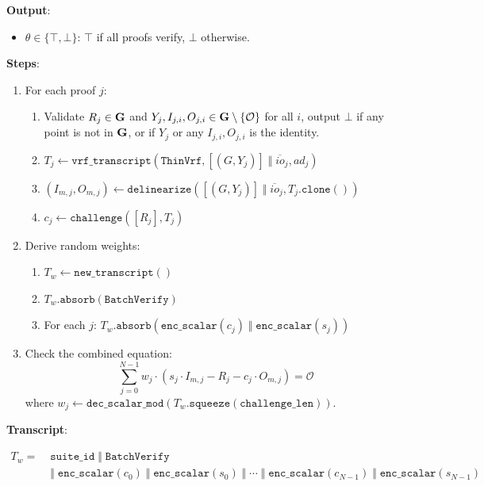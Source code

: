 \documentclass[
]{article}
\providecommand{\tightlist}{%
  \setlength{\itemsep}{0pt}\setlength{\parskip}{0pt}}
\begin{document}
\textbf{Output}:

\begin{itemize}
\tightlist
\item
  \(\theta \in \{ \top, \bot \}\): \(\top\) if all proofs verify,
  \(\bot\) otherwise.
\end{itemize}

\textbf{Steps}:

\begin{enumerate}
\def\labelenumi{\arabic{enumi}.}
\tightlist
\item
  For each proof \(j\):

  \begin{enumerate}
  \def\labelenumii{\alph{enumii}.}
  \tightlist
  \item
    Validate \(R_j \in \bold{G}\) and
    \(Y_j, I_{j,i}, O_{j,i} \in \bold{G}\setminus \{\mathcal{O}\}\) for
    all \(i\), output \(\bot\) if any point is not in \(\bold{G}\), or
    if \(Y_j\) or any \(I_{j,i}, O_{j,i}\) is the identity.
  \item
    \(T_j \gets \texttt{vrf\_transcript}(\texttt{ThinVrf}, [(G, Y_j)] \;\Vert\; \overline{io}_j, ad_j)\)
  \item
    \((I_{m,j}, O_{m,j}) \gets \texttt{delinearize}([(G, Y_j)] \;\Vert\; \overline{io}_j, T_j.\texttt{clone}())\)
  \item
    \(c_j \gets \texttt{challenge}([R_j], T_j)\)
  \end{enumerate}
\item
  Derive random weights:

  \begin{enumerate}
  \def\labelenumii{\alph{enumii}.}
  \tightlist
  \item
    \(T_w \gets \texttt{new\_transcript}()\)
  \item
    \(T_w.\texttt{absorb}(\texttt{BatchVerify})\)
  \item
    For each \(j\):
    \(T_w.\texttt{absorb}(\texttt{enc\_scalar}(c_j) \;\Vert\; \texttt{enc\_scalar}(s_j))\)
  \end{enumerate}
\item
  Check the combined equation:
  \[\sum_{j=0}^{N-1} w_j \cdot (s_j \cdot I_{m,j} - R_j - c_j \cdot O_{m,j}) = \mathcal{O}\]
  where
  \(w_j \gets \texttt{dec\_scalar\_mod}(T_w.\texttt{squeeze}(\texttt{challenge\_len}))\).
\end{enumerate}

\textbf{Transcript}:

\(\begin{aligned}
T_w = &\; \texttt{suite\_id} \;\Vert\; \texttt{BatchVerify} \\
  &\; \Vert\; \texttt{enc\_scalar}(c_0) \;\Vert\; \texttt{enc\_scalar}(s_0) \;\Vert\; \cdots \;\Vert\; \texttt{enc\_scalar}(c_{N-1}) \;\Vert\; \texttt{enc\_scalar}(s_{N-1})
\end{aligned}\)
\end{document}
